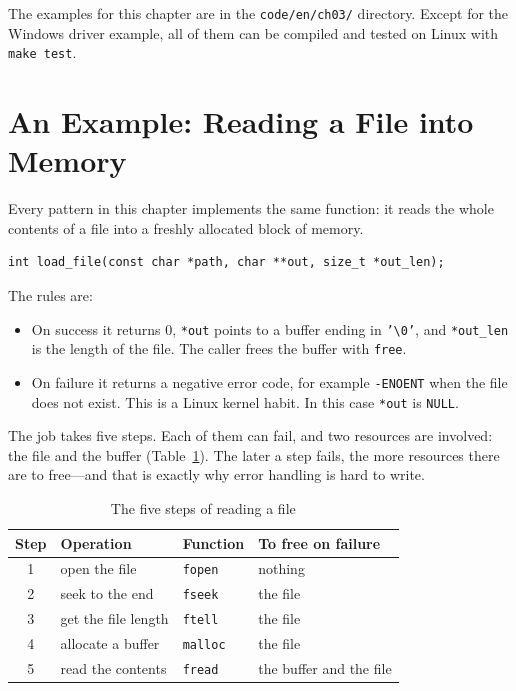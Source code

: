 The examples for this chapter are in the \texttt{code/en/ch03/} directory. Except for the Windows driver example, all of them can be compiled and tested on Linux with \texttt{make test}.

\section{An Example: Reading a File into Memory}
\label{sec:load-file}

Every pattern in this chapter implements the same function: it reads the whole contents of a file into a freshly allocated block of memory.
\begin{verbatim}
int load_file(const char *path, char **out, size_t *out_len);
\end{verbatim}
The rules are:
\begin{itemize}
  \item On success it returns 0, \texttt{*out} points to a buffer ending in \texttt{'\textbackslash 0'}, and \texttt{*out\_len} is the length of the file. The caller frees the buffer with \texttt{free}.
  \item On failure it returns a negative error code, for example \texttt{-ENOENT} when the file does not exist. This is a Linux kernel habit. In this case \texttt{*out} is \texttt{NULL}.
\end{itemize}

The job takes five steps. Each of them can fail, and two resources are involved: the file and the buffer (Table~\ref{tab:load-steps}). The later a step fails, the more resources there are to free---and that is exactly why error handling is hard to write.

\begin{table}[htbp]
  \begin{lazywide}
  \caption{The five steps of reading a file}
  \label{tab:load-steps}
  \begin{tabular}{clll}
    \toprule
    Step & Operation & Function & To free on failure \\
    \midrule
    1 & open the file          & \texttt{fopen}  & nothing \\
    2 & seek to the end        & \texttt{fseek}  & the file \\
    3 & get the file length    & \texttt{ftell}  & the file \\
    4 & allocate a buffer      & \texttt{malloc} & the file \\
    5 & read the contents      & \texttt{fread}  & the buffer and the file \\
    \bottomrule
  \end{tabular}
  \end{lazywide}
\end{table}

